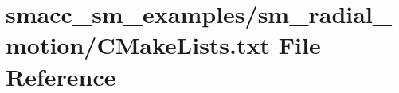 \hypertarget{smacc__sm__examples_2sm__radial__motion_2CMakeLists_8txt}{}\section{smacc\+\_\+sm\+\_\+examples/sm\+\_\+radial\+\_\+motion/\+C\+Make\+Lists.txt File Reference}
\label{smacc__sm__examples_2sm__radial__motion_2CMakeLists_8txt}
